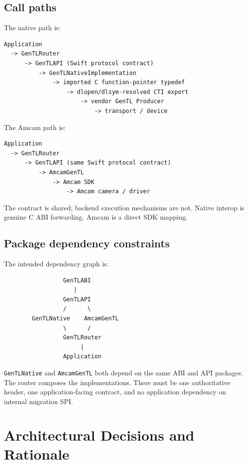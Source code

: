 \documentclass[11pt,a4paper]{report}
\begin{document}
\section{Call paths}
The native path is:

\begin{verbatim}
Application
  -> GenTLRouter
      -> GenTLAPI (Swift protocol contract)
          -> GenTLNativeImplementation
              -> imported C function-pointer typedef
                  -> dlopen/dlsym-resolved CTI export
                      -> vendor GenTL Producer
                          -> transport / device
\end{verbatim}

The Amcam path is:

\begin{verbatim}
Application
  -> GenTLRouter
      -> GenTLAPI (same Swift protocol contract)
          -> AmcamGenTL
              -> Amcam SDK
                  -> Amcam camera / driver
\end{verbatim}

The contract is shared; backend execution mechanisms are not. Native interop is genuine C ABI forwarding. Amcam is a direct SDK mapping.

\section{Package dependency constraints}
The intended dependency graph is:

\begin{verbatim}
                 GenTLABI
                    |
                 GenTLAPI
                 /      \
        GenTLNative    AmcamGenTL
                 \      /
                 GenTLRouter
                      |
                 Application
\end{verbatim}

\texttt{GenTLNative} and \texttt{AmcamGenTL} both depend on the same ABI and API packages. The router composes the implementations. There must be one authoritative header, one application-facing contract, and no application dependency on internal migration SPI.

\chapter{Architectural Decisions and Rationale}
\end{document}
